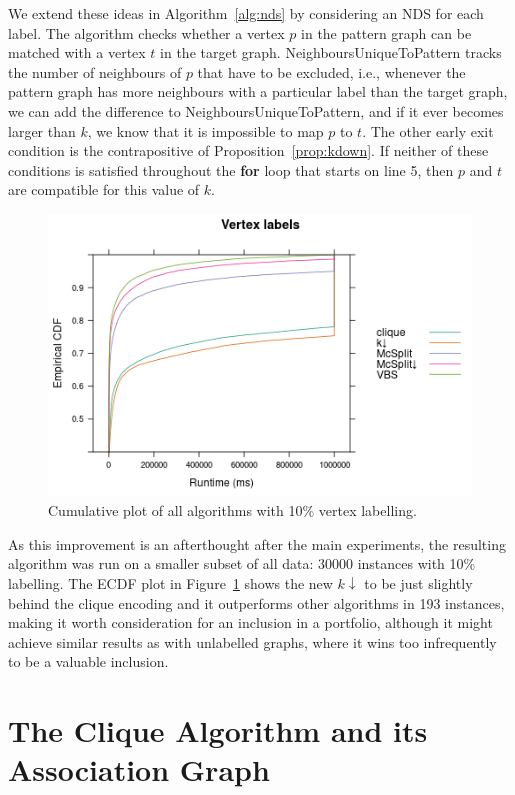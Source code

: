 \documentclass{l4proj}
\theoremstyle{definition}
\theoremstyle{remark}
\begin{document}
We extend these ideas in Algorithm~\ref{alg:nds} by considering an NDS for each
label. The algorithm checks whether a vertex $p$ in the pattern graph can be
matched with a vertex $t$ in the target graph.
\textsf{NeighboursUniqueToPattern} tracks the number of neighbours of $p$ that
have to be excluded, i.e., whenever the pattern graph has more neighbours with a
particular label than the target graph, we can add the difference to
\textsf{NeighboursUniqueToPattern}, and if it ever becomes larger than $k$, we
know that it is impossible to map $p$ to $t$. The other early exit condition is
the contrapositive of Proposition~\ref{prop:kdown}. If neither of these
conditions is satisfied throughout the \textbf{for} loop that starts on line 5,
then $p$ and $t$ are compatible for this value of $k$.

\begin{figure}
  \centering
  \includegraphics[scale=0.5]{images/ecdf_kdown.png}
  \caption{Cumulative plot of all algorithms with 10\% vertex labelling.}
  \label{fig:ecdf_kdown}
\end{figure}

As this improvement is an afterthought after the main experiments, the resulting
algorithm was run on a smaller subset of all data: \num{30000} instances with
10\% labelling. The ECDF plot in Figure~\ref{fig:ecdf_kdown} shows the new
$k{\downarrow}$ to be just slightly behind the clique encoding and it outperforms
other algorithms in 193 instances, making it worth consideration for an
inclusion in a portfolio, although it might achieve similar results as with
unlabelled graphs, where it wins too infrequently to be a valuable inclusion.

\section{The Clique Algorithm and its Association Graph} \label{sec:clique}
\end{document}
